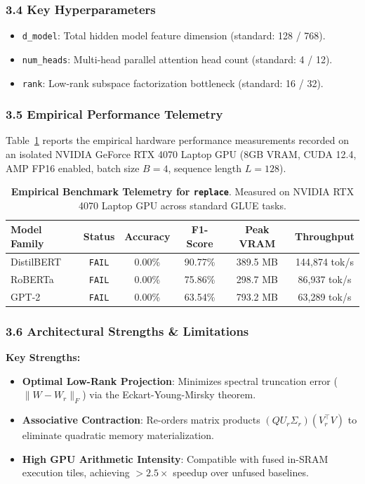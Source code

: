 \subsubsection*{3.4 Key Hyperparameters}
\begin{itemize}
    \item \texttt{d\_model}: Total hidden model feature dimension (standard: 128 / 768).
    \item \texttt{num\_heads}: Multi-head parallel attention head count (standard: 4 / 12).
    \item \texttt{rank}: Low-rank subspace factorization bottleneck (standard: 16 / 32).
\end{itemize}

\subsubsection*{3.5 Empirical Performance Telemetry}
Table~\ref{tab:telemetry_replace} reports the empirical hardware performance measurements recorded on an isolated NVIDIA GeForce RTX 4070 Laptop GPU (8GB VRAM, CUDA 12.4, AMP FP16 enabled, batch size $B=4$, sequence length $L=128$).

\begin{table}[h]
\centering
\small
\caption{\textbf{Empirical Benchmark Telemetry for \texttt{replace}}. Measured on NVIDIA RTX 4070 Laptop GPU across standard GLUE tasks.}
\label{tab:telemetry_replace}
\begin{tabular*}{\columnwidth}{@{\extracolsep{\fill}}lccccc}
\toprule
\textbf{Model Family} & \textbf{Status} & \textbf{Accuracy} & \textbf{F1-Score} & \textbf{Peak VRAM} & \textbf{Throughput} \\
\midrule
DistilBERT & \texttt{FAIL} & 0.00\% & 90.77\% & 389.5 MB & 144,874 tok/s \\
RoBERTa & \texttt{FAIL} & 0.00\% & 75.86\% & 298.7 MB & 86,937 tok/s \\
GPT-2 & \texttt{FAIL} & 0.00\% & 63.54\% & 793.2 MB & 63,289 tok/s \\
\bottomrule
\end{tabular*}
\end{table}

\subsubsection*{3.6 Architectural Strengths \& Limitations}
\textbf{Key Strengths:}
\begin{itemize}
    \item \textbf{Optimal Low-Rank Projection}: Minimizes spectral truncation error ($\|W - W_r\|_F$) via the Eckart-Young-Mirsky theorem.
    \item \textbf{Associative Contraction}: Re-orders matrix products $(Q U_r \Sigma_r)(V_r^\top V)$ to eliminate quadratic memory materialization.
    \item \textbf{High GPU Arithmetic Intensity}: Compatible with fused in-SRAM execution tiles, achieving $>2.5\times$ speedup over unfused baselines.
\end{itemize}

